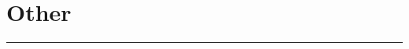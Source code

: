 \documentclass[a4paper]{article}
\begin{document}
\begin{minipage}[t]{0.5\textwidth}
        \section*{Other}
        \hrule

    \end{minipage}
\end{document}
